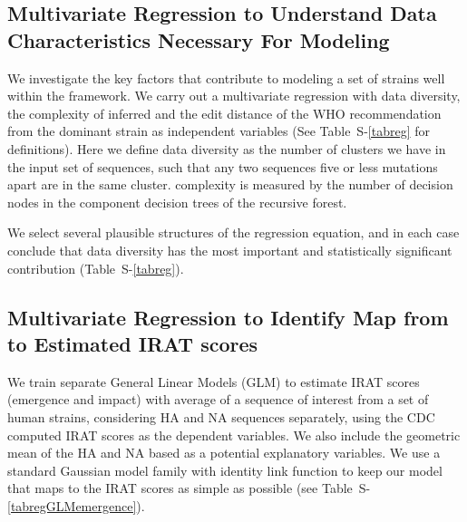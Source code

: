 {\subsection*{Multivariate Regression to Understand Data Characteristics Necessary For \tnet Modeling}

We investigate the key factors that contribute to modeling a set of strains well within the \tnet framework. We carry out a multivariate regression with data diversity, the complexity of inferred \tnet and the edit distance of the WHO recommendation from the dominant strain as independent variables (See \SUPPLEMENTARY Table~S-\ref{tabreg} for definitions). Here we define data diversity as the number of clusters we have in the input set of sequences, such that any two sequences five or less mutations apart are in the same cluster. \tnet complexity is measured by the number of decision nodes in the component decision trees of the recursive forest.

We select several plausible structures of the regression equation, and in each case conclude that  data diversity has the most important and statistically significant contribution (\SUPPLEMENTARY Table~S-\ref{tabreg}).

\subsection*{Multivariate Regression to Identify Map from \qdist to Estimated IRAT scores}
We train separate General Linear Models (GLM) to estimate IRAT scores (emergence and impact) with average \qdist of a sequence of interest from a set of human strains, considering HA and NA sequences separately, using the CDC computed IRAT scores as the dependent variables. We also  include the geometric mean of the HA and NA based  as a potential explanatory variables. We use a standard Gaussian model family with identity link function to keep our model that maps   to the IRAT scores as simple as possible (see \SUPPLEMENTARY Table~S-\ref{tabregGLMemergence}).


 



}